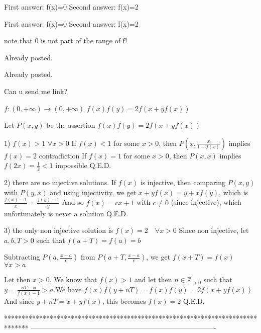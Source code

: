 \begin{solution}
	First answer: f(x)=0
Second answer: f(x)=2
\end{solution}



\begin{solution}
	\begin{tcolorbox}First answer: f(x)=0
Second answer: f(x)=2\end{tcolorbox}

note that 0 is not part of the range of f!
\end{solution}



\begin{solution}
	Already posted.
\end{solution}



\begin{solution}
	\begin{tcolorbox}Already posted.\end{tcolorbox}

Can u send me link?
\end{solution}



\begin{solution}
	\begin{tcolorbox}$f: (0,+\infty)\rightarrow (0,+\infty)$
$f(x)f(y)=2f(x+yf(x))$\end{tcolorbox}
Let $P(x,y)$ be the assertion $f(x)f(y)=2f(x+yf(x))$

1) $f(x)>1$ $\forall x>0$
If $f(x)<1$ for some $x>0$, then $P(x,\frac x{1-f(x)})$ implies $f(x)=2$ contradiction
If $f(x)=1$ for some $x>0$, then $P(x,x)$ implies $f(2x)=\frac 12<1$ impossible
Q.E.D.

2) there are no injective solutions.
If $f(x)$ is injective, then comparing $P(x,y)$ with $P(y,x)$ and using injectivity, we get 
$x+yf(x)=y+xf(y)$, which is $\frac{f(x)-1}x=\frac{f(y)-1}y$
And so $f(x)=cx+1$ with $c\ne 0$ (since injective), which unfortunately is never a solution
Q.E.D.

3) the only non injective solution is $\boxed{f(x)=2\quad\forall x>0}$
Since non injective, let $a,b,T>0$ such that $f(a+T)=f(a)=b$

Subtracting $P(a,\frac{x-a}c)$ from $P(a+T,\frac{x-a}c)$, we get $f(x+T)=f(x)$ $\forall x>a$

Let then $x>0$. We know that $f(x)>1$ and let then $n\in\mathbb Z_{>0}$ such that $y=\frac {nT-x}{f(x)-1}>a$
We have $f(x)f(y+nT)=f(x)f(y)=2f(x+yf(x))$
And since $y+nT=x+yf(x)$, this becomes $f(x)=2$
Q.E.D.
\end{solution}
*******************************************************************************
-------------------------------------------------------------------------------

